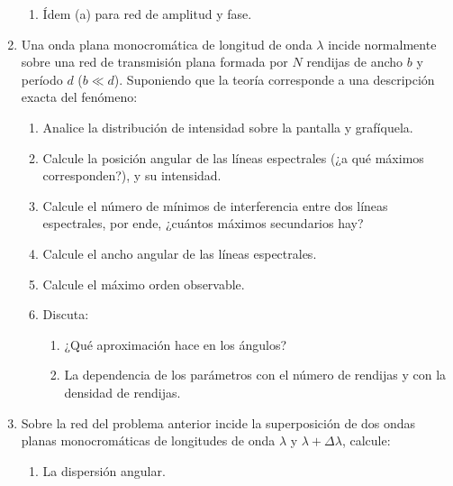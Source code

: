 \documentclass[11pt,spanish]{article}
\begin{document}
\begin{enumerate}
\begin{enumerate}
        \item Ídem (a) para red de amplitud y fase. 
    \end{enumerate}


    \item Una onda plana monocromática de longitud de onda $\lambda$ incide
    normalmente sobre una red de transmisión plana formada por $N$ rendijas
    de ancho $b$ y período $d$ ($b\ll d$). Suponiendo que la teoría
    corresponde a una descripción exacta del fenómeno: 

    \begin{enumerate}
        \item Analice la distribución de intensidad sobre la pantalla y grafíquela.

        \item Calcule la posición angular de las líneas espectrales (¿a qué máximos
        corresponden?), y su intensidad.

        \item Calcule el número de mínimos de interferencia entre dos líneas
        espectrales, por ende, ¿cuántos máximos secundarios hay?

        \item Calcule el ancho angular de las líneas espectrales.

        \item Calcule el máximo orden observable.

        \item Discuta: 
        
        \begin{enumerate}
            \item ¿Qué aproximación hace en los ángulos?

            \item La dependencia de los parámetros con el número de rendijas y
            con la densidad de rendijas.
        \end{enumerate}
    \end{enumerate}


    \item Sobre la red del problema anterior incide la superposición de dos
    ondas planas monocromáticas de longitudes de onda $\lambda$ y
    $\lambda+\Delta\lambda$, calcule: 

    \begin{enumerate}
        \item La dispersión angular.


\end{enumerate}
\end{enumerate}
\end{document}

